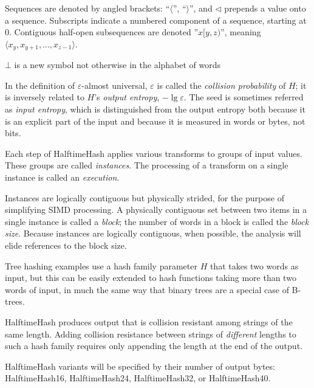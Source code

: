\documentclass[runningheads]{llncs}
\begin{document}
Sequences are denoted by angled brackets: ``$\langle$'', ``$\rangle$'', and $\triangleleft$ prepends a value onto a sequence.
Subscripts indicate a numbered component of a sequence, starting at 0.
Contiguous half-open subsequences are denoted ''$x[y,z)$'', meaning $\langle x_y, x_{y+1}, \dots, x_{z-1} \rangle$.

$\bot$ is a new symbol not otherwise in the alphabet of words

In the definition of $\varepsilon$-almost universal, $\varepsilon$ is called the {\em collision probability} of $H$; it is inversely related to $H$'s {\em output entropy}, $-\lg \varepsilon$.
The seed is sometimes referred as {\em input entropy}, which is distinguished from the output entropy both because it is an explicit part of the input and because it is measured in words or bytes, not bits.

Each step of HalftimeHash applies various transforms to groups of input values.
These groups are called {\em instances}.
The processing of a transform on a single instance is called an {\em execution}.

Instances are logically contiguous but physically strided, for the purpose of simplifying SIMD processing.
A physically contiguous set between two items in a single instance is called a {\em block}; the number of words in a block is called the {\em block size}.
Because instances are logically contiguous, when possible, the analysis will elide references to the block size.

Tree hashing examples use a hash family parameter $H$ that takes two words as input, but this can be easily extended to hash functions taking more than two words of input, in much the same way that binary trees are a special case of B-trees.

HalftimeHash produces output that is collision resistant among strings of the same length.
Adding collision resistance between strings of {\em different} lengths to such a hash family requires only appending the length at the end of the output.

HalftimeHash variants will be specified by their number of output bytes: HalftimeHash16, HalftimeHash24, HalftimeHash32, or HalftimeHash40.
\end{document}
